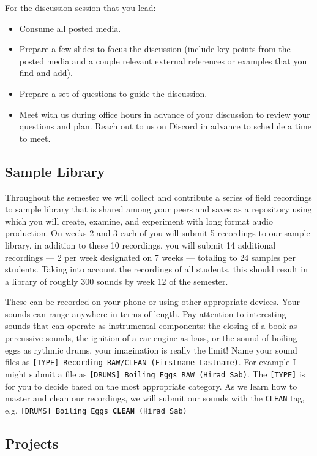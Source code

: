 For the discussion session that you lead:
\begin{itemize}
      \tightlist
      \item Consume all posted media.
      \item Prepare a few slides to focus the discussion (include key points from the posted media and a couple relevant external references or examples that you find and add).
      \item Prepare a set of questions to guide the discussion.
      \item Meet with us during office hours in advance of your discussion to review your questions and plan. Reach out to us on Discord in advance to schedule a time to meet.
\end{itemize}

\subsection{Sample Library}

Throughout the semester we will collect and contribute a series of field recordings to sample library that is shared among your peers and saves as a repository using which you will create, examine, and experiment with long format audio production. On weeks 2 and 3 each of you will submit 5 recordings to our sample library. in addition to these 10 recordings, you will submit 14 additional recordings --- 2 per week designated on 7 weeks --- totaling to 24 samples per students. Taking into account the recordings of all students, this should result in a library of roughly 300 sounds by week 12 of the semester. 

These can be recorded on your phone or using other appropriate devices. Your sounds can range anywhere in terms of length. Pay attention to interesting sounds that can operate as instrumental components: the closing of a book as percussive sounds, the ignition of a car engine as bass, or the sound of boiling eggs as rythmic drums, your imagination is really the limit! Name your sound files as \texttt{[TYPE] Recording RAW/CLEAN (Firstname Lastname)}. For example I might submit a file as \texttt{[DRUMS] Boiling Eggs RAW (Hirad Sab)}. The \texttt{[TYPE]} is for you to decide based on the most appropriate category. As we learn how to master and clean our recordings, we will submit our sounds with the \texttt{CLEAN} tag, e.g. \texttt{[DRUMS] Boiling Eggs \textbf{CLEAN} (Hirad Sab)}

\subsection{Projects}

